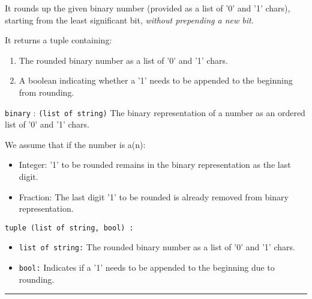 \documentclass[12pt]{article}
\begin{document}
It rounds up the given binary number (provided as a list of '0' and '1' chars), starting from the least significant bit, \emph{without prepending a new bit}. 

It returns a tuple containing:
\begin{enumerate}
    \item The rounded binary number as a list of '0' and '1' chars.
    \item A boolean indicating whether a '1' needs to be appended to the beginning from rounding.
\end{enumerate}

\begin{description}
    \item[Parameters:]
    \item \texttt{binary} : \texttt{(list of string)} The binary representation of a number as an ordered list of '0' and '1' chars.
    
    We assume that if the number is a(n):
    \begin{itemize}
        \item Integer: '1' to be rounded remains in the binary representation as the last digit.
        \item Fraction: The last digit '1' to be rounded is already removed from binary representation.
    \end{itemize}

    \item[Returns:]
    \item \texttt{tuple (list of string, bool) :}
    \begin{itemize}
        \item \texttt{list of string:} The rounded binary number as a list of '0' and '1' chars.
        \item \texttt{bool:} Indicates if a '1' needs to be appended to the beginning due to rounding.\\
    \end{itemize}
\end{description}
\hrule
\end{document}
